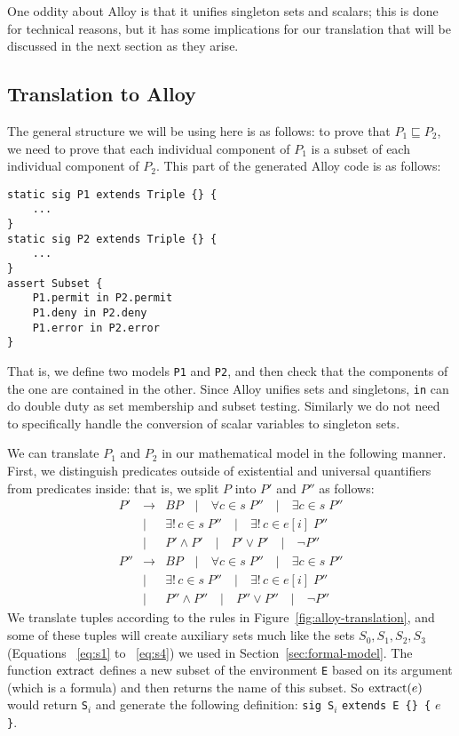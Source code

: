 One oddity about Alloy is that it unifies singleton sets and scalars;
this is done for technical reasons, but it has some implications for
our translation that will be discussed in the next section as they
arise.

\subsection{Translation to Alloy}
\label{sec:translation-alloy}

The general structure we will be using here is as follows: to prove
that $P_1 \sqsubseteq P_2$, we need to prove that each individual
component of $P_1$ is a subset of each individual component of $P_2$.
This part of the generated Alloy code is as follows:
\begin{verbatim}
static sig P1 extends Triple {} {
    ...
}
static sig P2 extends Triple {} {
    ...
}
assert Subset {
    P1.permit in P2.permit
    P1.deny in P2.deny
    P1.error in P2.error
}
\end{verbatim}
That is, we define two models \texttt{P1} and \texttt{P2}, and then
check that the components of the one are contained in the other.
Since Alloy unifies sets and singletons, \texttt{in} can do double
duty as set membership and subset testing.  Similarly we do not need
to specifically handle the conversion of scalar variables to singleton
sets.

We can translate $P_1$ and $P_2$ in our mathematical model in the
following manner. First, we distinguish predicates outside of
existential and universal quantifiers from predicates inside: that is,
we split $P$ into $P'$ and $P''$ as follows:
\begin{eqnarray*}
  P' & \rightarrow & BP \quad | \quad \forall c \in s \; P'' \quad |
  \quad \exists c \in s \; P'' \\
  & | & \exists ! \, c \in s \; P'' \quad | 
  \quad \exists ! \, c \in e[i] \; P'' \\
  & | & P' \wedge P' \quad | \quad P' \vee P' \quad | \quad \neg P'' \\
  P'' & \rightarrow & BP \quad | \quad \forall c \in s \; P'' \quad |
  \quad \exists c \in s \; P'' \\
  & | & \exists ! \, c \in s \; P'' \quad | \quad 
  \exists ! \, c \in e[i] \; P'' \\
  & | & P'' \wedge P'' \quad | \quad P'' \vee P'' \quad | \quad \neg P''
\end{eqnarray*}
We translate tuples according to the rules in
Figure~\ref{fig:alloy-translation}, and some of these tuples will
create auxiliary sets much like the sets $S_0, S_1, S_2, S_3$
(Equations ~\eqref{eq:s1} to ~\eqref{eq:s4}) we used in
Section~\ref{sec:formal-model}.  The function $\operatorname{extract}$ defines a new
subset of the environment \texttt{E} based on its argument (which is a
formula) and then returns the name of this subset.  So $\operatorname{extract}(e)$
would return \texttt{S$_i$} and generate the following definition:
\verb|sig S|$_i$ \verb|extends E {} {| $e$ \verb|}|.

